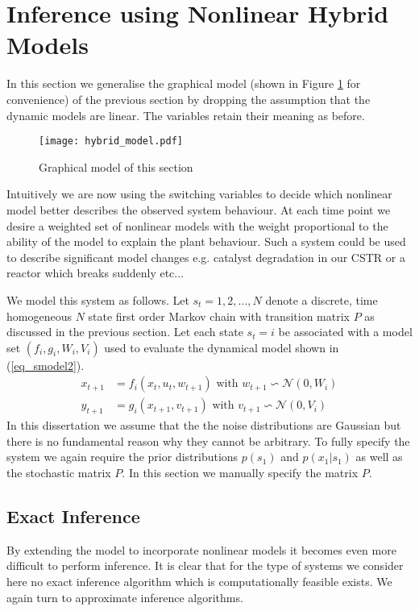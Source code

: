 \section{Inference using Nonlinear Hybrid Models}
In this section we generalise the graphical model (shown in Figure \ref{fig_hybridmod2} for convenience) of the previous section by dropping the assumption that the dynamic models are linear. The variables retain their meaning as before.     
\begin{figure}[H] 
\centering
\texttt{[image: hybrid\_model.pdf]}
\caption{Graphical model of this section}
\label{fig_hybridmod2}
\end{figure}
Intuitively we are now using the switching variables to decide which nonlinear model better describes the observed system behaviour. At each time point we desire a weighted set of nonlinear models with the weight proportional to the ability of the model to explain the plant behaviour. Such a system could be used to describe significant model changes e.g. catalyst degradation in our CSTR or a reactor which breaks suddenly etc... 

We model this system as follows. Let $s_t=1,2,..., N$ denote a discrete, time homogeneous $N$ state first order Markov chain with transition matrix $P$ as discussed in the previous section. Let each state $s_t=i$ be associated with a model set $\left(f_i, g_i, W_i, V_i \right)$ used to evaluate the dynamical model shown in (\ref{eq_smodel2}).
\begin{equation}
\begin{aligned}
x_{t+1} &= f_i(x_t, u_t, w_{t+1}) \text{ with } w_{t+1} \backsim \mathcal{N}(0, W_i)\\
y_{t+1} &= g_i(x_{t+1}, v_{t+1}) \text{ with } v_{t+1} \backsim \mathcal{N}(0,V_i)
\end{aligned}
\label{eq_smodel2}
\end{equation}
In this dissertation we assume that the the noise distributions are Gaussian but there is no fundamental reason why they cannot be arbitrary. To fully specify the system we again require the prior distributions $p(s_1)$ and $p(x_1|s_1)$ as well as the stochastic matrix $P$. In this section we manually specify the matrix $P$. 

\subsection{Exact Inference}
By extending the model to incorporate nonlinear models it becomes even more difficult to perform inference. It is clear that for the type of systems we consider here no exact inference algorithm which is computationally feasible exists. We again turn to approximate inference algorithms.

